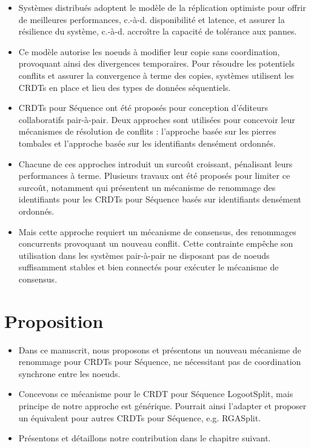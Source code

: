\documentclass[12pt]{thesul}
\newcommand{\eg}{e.g.\xspace}
\newcommand{\ie}{c.-à-d.\xspace}
\begin{document}
\begin{itemize}
  \item Systèmes distribués adoptent le modèle de la réplication optimiste pour offrir de meilleures performances, \ie disponibilité et latence, et assurer la résilience du système, \ie accroître la capacité de tolérance aux pannes.
  \item Ce modèle autorise les noeuds à modifier leur copie sans coordination, provoquant ainsi des divergences temporaires.
    Pour résoudre les potentiels conflits et assurer la convergence à terme des copies, systèmes utilisent les \acp{CRDT} en place et lieu des types de données séquentiels.
  \item \acp{CRDT} pour Séquence ont été proposés pour conception d'éditeurs collaboratifs pair-à-pair.
    Deux approches sont utilisées pour concevoir leur mécanismes de résolution de conflits : l'approche basée sur les pierres tombales et l'approche basée sur les identifiants densément ordonnés.
  \item Chacune de ces approches introduit un surcoût croissant, pénalisant leurs performances à terme.
    Plusieurs travaux ont été proposés pour limiter ce surcoût, notamment \cite{letia:hal-01248270, zawirski:hal-01248197} qui présentent un mécanisme de renommage des identifiants pour les \acp{CRDT} pour Séquence basés sur identifiants densément ordonnés.
  \item Mais cette approche requiert un mécanisme de consensus, des renommages concurrents provoquant un nouveau conflit.
    Cette contrainte empêche son utilisation dans les systèmes pair-à-pair ne disposant pas de noeuds suffisamment stables et bien connectés pour exécuter le mécanisme de consensus.
\end{itemize}

\section{Proposition}

\begin{itemize}
  \item Dans ce manuscrit, nous proposons et présentons un nouveau mécanisme de renommage pour \acp{CRDT} pour Séquence, ne nécessitant pas de coordination synchrone entre les noeuds.
  \item Concevons ce mécanisme pour le \ac{CRDT} pour Séquence LogootSplit, mais principe de notre approche est générique.
    Pourrait ainsi l'adapter et proposer un équivalent pour autres \acp{CRDT} pour Séquence, \eg RGASplit.
  \item Présentons et détaillons notre contribution dans le chapitre suivant.
\end{itemize}
\end{document}
